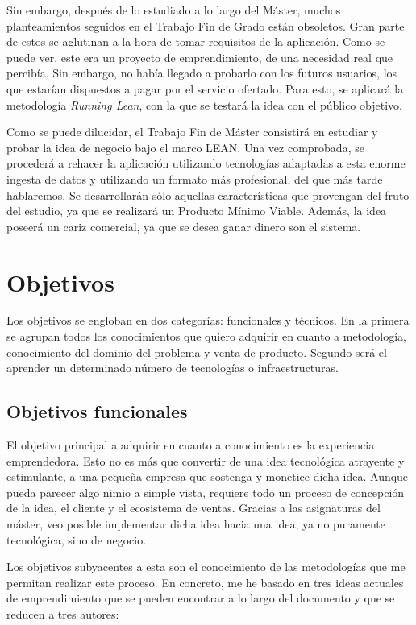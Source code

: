 Sin embargo, después de lo estudiado a lo largo del Máster, muchos planteamientos seguidos en el Trabajo Fin de Grado están obsoletos. Gran parte de estos se aglutinan a la hora de tomar requisitos de la aplicación. Como se puede ver, este era un proyecto de emprendimiento, de una necesidad real que percibía. Sin embargo, no había llegado a probarlo con los futuros usuarios, los que estarían dispuestos a pagar por el servicio ofertado. Para esto, se aplicará la metodología \textit{Running Lean}, con la que se testará la idea con el público objetivo.

Como se puede dilucidar, el Trabajo Fin de Máster consistirá en estudiar y probar la idea de negocio bajo el marco LEAN. Una vez comprobada, se procederá a rehacer la aplicación utilizando tecnologías adaptadas a esta enorme ingesta de datos y utilizando un formato más profesional, del que más tarde hablaremos. Se desarrollarán sólo aquellas características que provengan del fruto del estudio, ya que se realizará un Producto Mínimo Viable. Además, la idea poseerá un cariz  comercial, ya que se desea ganar dinero son el sistema.


\section{Objetivos}\label{sec:objetivos}

Los objetivos se engloban en dos categorías: funcionales y técnicos. En la primera se agrupan todos los conocimientos que quiero adquirir en cuanto a metodología, conocimiento del dominio del problema y venta de producto. Segundo será el aprender un determinado número de tecnologías o infraestructuras.


\subsection{Objetivos funcionales}

El objetivo principal a adquirir en cuanto a conocimiento es la experiencia emprendedora. Esto no es más que convertir de una idea tecnológica atrayente y estimulante, a una pequeña empresa que sostenga y monetice dicha idea. Aunque pueda parecer algo nimio a simple vista, requiere todo un proceso de concepción de la idea, el cliente y el ecosistema de ventas. Gracias a las asignaturas del máster, veo posible implementar dicha idea hacia una idea, ya no puramente tecnológica, sino de negocio.

Los objetivos subyacentes a esta son el conocimiento de las metodologías que me permitan realizar este proceso. En concreto, me he basado en tres ideas actuales de emprendimiento que se pueden encontrar a lo largo del documento y que se reducen a tres autores:

